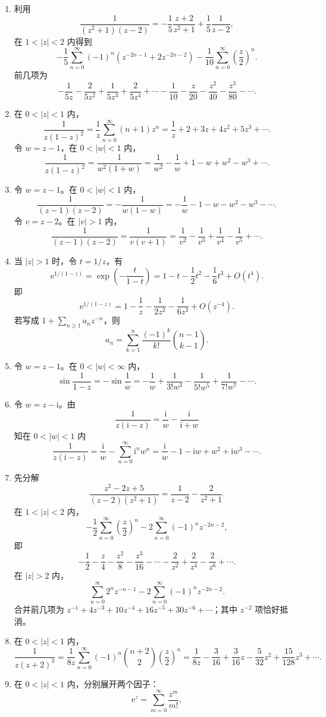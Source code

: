 \documentclass[UTF8,11pt,a4paper,fontset=fandol]{ctexart}
\newcommand{\ii}{\mathrm{i}}
\newcommand{\ee}{\mathrm{e}}
\begin{document}
\begin{enumerate}
\item 利用
\[
\frac1{(z^2+1)(z-2)}=-\frac15\frac{z+2}{z^2+1}+\frac15\frac1{z-2},
\]
在 $1<|z|<2$ 内得到
\[
-\frac15\sum_{n=0}^{\infty}(-1)^n
\left(z^{-2n-1}+2z^{-2n-2}\right)
-\frac1{10}\sum_{n=0}^{\infty}\left(\frac z2\right)^n.
\]
前几项为
\[
-\frac1{5z}-\frac2{5z^2}+\frac1{5z^3}+\frac2{5z^4}+\cdots
-\frac1{10}-\frac z{20}-\frac{z^2}{40}-\frac{z^3}{80}-\cdots.
\]
\item 在 $0<|z|<1$ 内，
\[
\frac1{z(1-z)^2}=\frac1z\sum_{n=0}^{\infty}(n+1)z^n
=\frac1z+2+3z+4z^2+5z^3+\cdots.
\]
令 $w=z-1$，在 $0<|w|<1$ 内，
\[
\frac1{z(1-z)^2}=\frac1{w^2(1+w)}
=\frac1{w^2}-\frac1w+1-w+w^2-w^3+\cdots.
\]
\item 令 $w=z-1$。在 $0<|w|<1$ 内，
\[
\frac1{(z-1)(z-2)}=-\frac1{w(1-w)}
=-\frac1w-1-w-w^2-w^3-\cdots.
\]
令 $v=z-2$。在 $|v|>1$ 内，
\[
\frac1{(z-1)(z-2)}=\frac1{v(v+1)}
=\frac1{v^2}-\frac1{v^3}+\frac1{v^4}-\frac1{v^5}+\cdots.
\]
\item 当 $|z|>1$ 时，令 $t=1/z$，有
\[
\ee^{1/(1-z)}=\exp\left(-\frac{t}{1-t}\right)
=1-t-\frac12t^2-\frac16t^3+O(t^4).
\]
即
\[
\ee^{1/(1-z)}=1-\frac1z-\frac1{2z^2}-\frac1{6z^3}+O(z^{-4}).
\]
若写成 $1+\sum_{n\ge1}a_nz^{-n}$，则
\[
a_n=\sum_{k=1}^n\frac{(-1)^k}{k!}\binom{n-1}{k-1}.
\]
\item 令 $w=z-1$。在 $0<|w|<\infty$ 内，
\[
\sin\frac1{1-z}=-\sin\frac1w
=-\frac1w+\frac1{3!w^3}-\frac1{5!w^5}+\frac1{7!w^7}-\cdots.
\]
\item 令 $w=z-\ii$。由
\[
\frac1{z(\ii-z)}=\frac{\ii}{w}-\frac{\ii}{\ii+w}
\]
知在 $0<|w|<1$ 内
\[
\frac1{z(\ii-z)}=\frac{\ii}{w}-\sum_{n=0}^{\infty}\ii^n w^n
=\frac{\ii}{w}-1-\ii w+w^2+\ii w^3-\cdots.
\]
\item 先分解
\[
\frac{z^2-2z+5}{(z-2)(z^2+1)}=\frac1{z-2}-\frac2{z^2+1}.
\]
在 $1<|z|<2$ 内，
\[
-\frac12\sum_{n=0}^{\infty}\left(\frac z2\right)^n
-2\sum_{n=0}^{\infty}(-1)^nz^{-2n-2},
\]
即
\[
-\frac12-\frac z4-\frac{z^2}8-\frac{z^3}{16}-\cdots
-\frac2{z^2}+\frac2{z^4}-\frac2{z^6}+\cdots.
\]
在 $|z|>2$ 内，
\[
\sum_{n=0}^{\infty}2^nz^{-n-1}
-2\sum_{n=0}^{\infty}(-1)^nz^{-2n-2}.
\]
合并前几项为 $z^{-1}+4z^{-3}+10z^{-4}+16z^{-5}+30z^{-6}+\cdots$；其中 $z^{-2}$ 项恰好抵消。
\item 在 $0<|z|<1$ 内，
\[
\frac1{z(z+2)^3}
=\frac1{8z}\sum_{n=0}^{\infty}(-1)^n\binom{n+2}{2}\left(\frac z2\right)^n
=\frac1{8z}-\frac3{16}+\frac3{16}z-\frac5{32}z^2+\frac{15}{128}z^3+\cdots.
\]
\item 在 $0<|z|<1$ 内，分别展开两个因子：
\[
\ee^z=\sum_{m=0}^{\infty}\frac{z^m}{m!},
\]
\end{enumerate}
\end{document}
